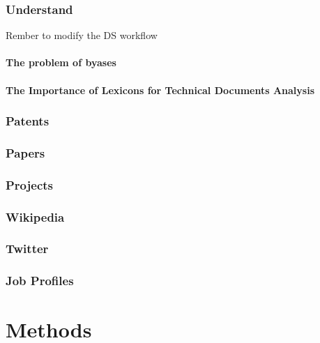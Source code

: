 \documentclass[]{book}
\theoremstyle{definition}
\theoremstyle{definition}
\theoremstyle{definition}
\theoremstyle{remark}
\begin{document}
\subsection{Understand}\label{sota_documents_understand}

Rember to modify the DS workflow

\subsubsection{The problem of
byases}\label{sota_documents_understand_byas}

\subsubsection{The Importance of Lexicons for Technical Documents
Analysis}\label{sota_documents_understand_lexicons}

\subsection{Patents}\label{sota_documents_patents}

\subsection{Papers}\label{sota_documents_papers}

\subsection{Projects}\label{sota_documents_projects}

\subsection{Wikipedia}\label{sota_documents_wiki}

\subsection{Twitter}\label{sota_documents_twitter}

\subsection{Job Profiles}\label{sota_documents_jobs}

\chapter{Methods}\label{methods}
\end{document}
